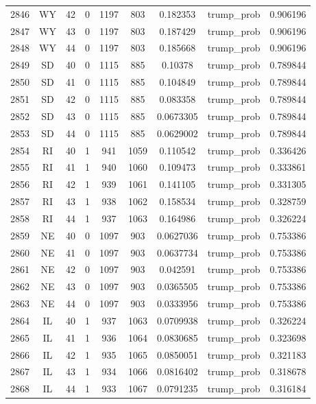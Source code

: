 \documentclass[12pt,a4paper]{article}
\begin{document}
\begin{tabular}{r|cccccccc}
	2846 & WY & 42 & 0 & 1197 & 803 & 0.182353 & trump\_prob & 0.906196 \\
	2847 & WY & 43 & 0 & 1197 & 803 & 0.187429 & trump\_prob & 0.906196 \\
	2848 & WY & 44 & 0 & 1197 & 803 & 0.185668 & trump\_prob & 0.906196 \\
	2849 & SD & 40 & 0 & 1115 & 885 & 0.10378 & trump\_prob & 0.789844 \\
	2850 & SD & 41 & 0 & 1115 & 885 & 0.104849 & trump\_prob & 0.789844 \\
	2851 & SD & 42 & 0 & 1115 & 885 & 0.083358 & trump\_prob & 0.789844 \\
	2852 & SD & 43 & 0 & 1115 & 885 & 0.0673305 & trump\_prob & 0.789844 \\
	2853 & SD & 44 & 0 & 1115 & 885 & 0.0629002 & trump\_prob & 0.789844 \\
	2854 & RI & 40 & 1 & 941 & 1059 & 0.110542 & trump\_prob & 0.336426 \\
	2855 & RI & 41 & 1 & 940 & 1060 & 0.109473 & trump\_prob & 0.333861 \\
	2856 & RI & 42 & 1 & 939 & 1061 & 0.141105 & trump\_prob & 0.331305 \\
	2857 & RI & 43 & 1 & 938 & 1062 & 0.158534 & trump\_prob & 0.328759 \\
	2858 & RI & 44 & 1 & 937 & 1063 & 0.164986 & trump\_prob & 0.326224 \\
	2859 & NE & 40 & 0 & 1097 & 903 & 0.0627036 & trump\_prob & 0.753386 \\
	2860 & NE & 41 & 0 & 1097 & 903 & 0.0637734 & trump\_prob & 0.753386 \\
	2861 & NE & 42 & 0 & 1097 & 903 & 0.042591 & trump\_prob & 0.753386 \\
	2862 & NE & 43 & 0 & 1097 & 903 & 0.0365505 & trump\_prob & 0.753386 \\
	2863 & NE & 44 & 0 & 1097 & 903 & 0.0333956 & trump\_prob & 0.753386 \\
	2864 & IL & 40 & 1 & 937 & 1063 & 0.0709938 & trump\_prob & 0.326224 \\
	2865 & IL & 41 & 1 & 936 & 1064 & 0.0830685 & trump\_prob & 0.323698 \\
	2866 & IL & 42 & 1 & 935 & 1065 & 0.0850051 & trump\_prob & 0.321183 \\
	2867 & IL & 43 & 1 & 934 & 1066 & 0.0816402 & trump\_prob & 0.318678 \\
	2868 & IL & 44 & 1 & 933 & 1067 & 0.0791235 & trump\_prob & 0.316184 \\
\end{tabular}
\end{document}
